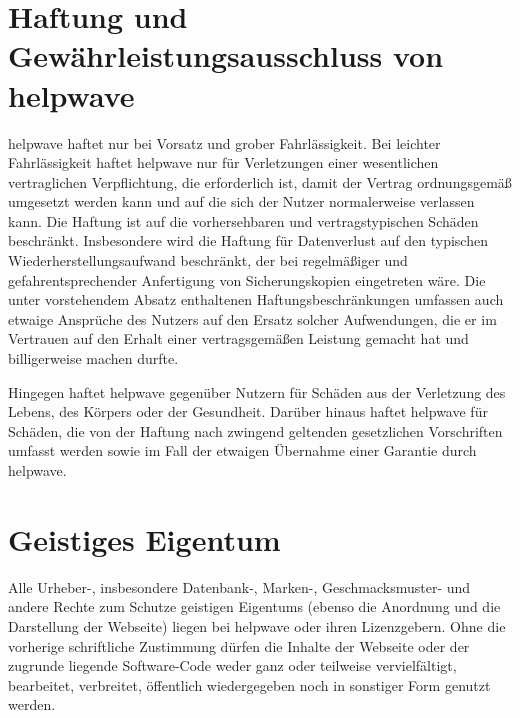 \documentclass[10pt]{article}
\begin{document}
\section{Haftung und Gewährleistungsausschluss von helpwave}
helpwave haftet nur bei Vorsatz und grober Fahrlässigkeit. Bei leichter Fahrlässigkeit haftet helpwave nur für Verletzungen einer wesentlichen vertraglichen Verpflichtung, die erforderlich ist, damit der Vertrag ordnungsgemäß umgesetzt werden kann und auf die sich der Nutzer normalerweise verlassen kann. Die Haftung ist auf die vorhersehbaren und vertragstypischen Schäden beschränkt. Insbesondere wird die Haftung für Datenverlust auf den typischen Wiederherstellungsaufwand beschränkt, der bei regelmäßiger und gefahrentsprechender Anfertigung von Sicherungskopien eingetreten wäre. Die unter vorstehendem Absatz enthaltenen Haftungsbeschränkungen umfassen auch etwaige Ansprüche des Nutzers auf den Ersatz solcher Aufwendungen, die er im Vertrauen auf den Erhalt einer vertragsgemäßen Leistung gemacht hat und billigerweise machen durfte.

Hingegen haftet helpwave gegenüber Nutzern für Schäden aus der Verletzung des Lebens, des Körpers
oder der Gesundheit. Darüber hinaus haftet helpwave für Schäden, die von der Haftung nach zwingend
geltenden gesetzlichen Vorschriften umfasst werden sowie im Fall der etwaigen Übernahme einer Garantie durch helpwave.

\section{Geistiges Eigentum}
Alle Urheber-, insbesondere Datenbank-, Marken-, Geschmacksmuster- und andere Rechte zum Schutze geistigen Eigentums
(ebenso die Anordnung und die Darstellung der Webseite) liegen bei helpwave oder ihren Lizenzgebern. Ohne die vorherige
schriftliche Zustimmung dürfen die Inhalte der Webseite oder der zugrunde liegende Software-Code weder ganz oder teilweise vervielfältigt, bearbeitet, verbreitet, öffentlich wiedergegeben noch in sonstiger Form genutzt werden.
\end{document}
